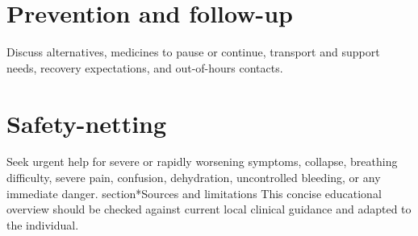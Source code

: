 \section*{Prevention and follow-up}
Discuss alternatives, medicines to pause or continue, transport and support needs, recovery expectations, and out-of-hours contacts.
\section*{Safety-netting}
Seek urgent help for severe or rapidly worsening symptoms, collapse, breathing difficulty, severe pain, confusion, dehydration, uncontrolled bleeding, or any immediate danger.
section*{Sources and limitations}
This concise educational overview should be checked against current local clinical guidance and adapted to the individual.
